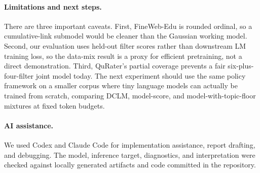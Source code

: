 \documentclass{article}
\begin{document}
\paragraph{Limitations and next steps.}
There are three important caveats. First, FineWeb-Edu is rounded ordinal, so a
cumulative-link submodel would be cleaner than the Gaussian working model.
Second, our evaluation uses held-out filter scores rather than downstream LM
training loss, so the data-mix result is a proxy for efficient pretraining, not
a direct demonstration. Third, QuRater's partial coverage prevents a fair
six-plus-four-filter joint model today. The next experiment should use the same
policy framework on a smaller corpus where tiny language models can actually be
trained from scratch, comparing DCLM, model-score, and model-with-topic-floor
mixtures at fixed token budgets.

\paragraph{AI assistance.}
We used Codex and Claude Code for implementation assistance, report drafting,
and debugging. The model, inference target, diagnostics, and interpretation were
checked against locally generated artifacts and code committed in the repository.
\end{document}
